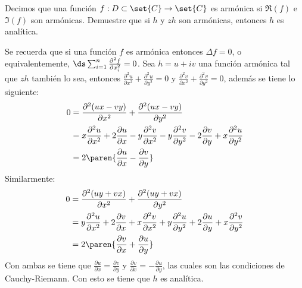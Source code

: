 \documentclass{homework}
\begin{document}
\begin{prob}
    Decimos que una función \(f:D\subset\set{C}\rightarrow\set{C}\) es armónica si \(\Re(f)\) e \(\Im(f)\) son armónicas. Demuestre que si  \(h\) y \(zh\) son armónicas, entonces \(h\) es analítica.
\end{prob}

\begin{sol}
    Se recuerda que si una función \(f\) es armónica entonces \(\Delta f=0\), o equivalentemente, \(\ds\sum_{i=1}^n\frac{\partial^2f}{\partial x_i^2}=0\). Sea \(h=u+iv\) una función armónica tal que \(zh\) también lo sea, entonces \(\frac{\partial^2 u}{\partial x^2}+\frac{\partial^2 u}{\partial y^2}=0\) y \(\frac{\partial^2 v}{\partial x^2}+\frac{\partial^2 v}{\partial y^2}=0\), además se tiene lo siguiente:
    \begin{align*}
        0 & =\frac{\partial^2 (ux-vy)}{\partial x^2}+\frac{\partial^2 (ux-vy)}{\partial y^2}                                                                                                                           \\
          & =x\frac{\partial^2 u}{\partial x^2}+2\frac{\partial u}{\partial x}-y\frac{\partial^2 v}{\partial x^2}-y\frac{\partial^2 v}{\partial y^2}-2\frac{\partial v}{\partial y}+x\frac{\partial^2 u}{\partial y^2} \\
          & =2\paren{\frac{\partial u}{\partial x}-\frac{\partial v}{\partial y}}
    \end{align*}
    Similarmente:
    \begin{align*}
        0 & =\frac{\partial^2 (uy+vx)}{\partial x^2}+\frac{\partial^2 (uy+vx)}{\partial y^2}                                                                                                                           \\
          & =y\frac{\partial^2 u}{\partial x^2}+2\frac{\partial v}{\partial x}+x\frac{\partial^2 v}{\partial x^2}+y\frac{\partial^2 u}{\partial y^2}+2\frac{\partial u}{\partial y}+x\frac{\partial^2 v}{\partial y^2} \\
          & =2\paren{\frac{\partial v}{\partial x}+\frac{\partial u}{\partial y}}
    \end{align*}
    Con ambas se tiene que \(\frac{\partial u}{\partial x}=\frac{\partial v}{\partial y}\) y \(\frac{\partial v}{\partial x}=-\frac{\partial u}{\partial y}\), las cuales son las condiciones de Cauchy-Riemann. Con esto se tiene que \(h\) es analítica.
\end{sol}
\end{document}
